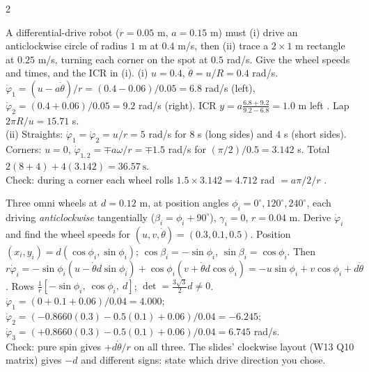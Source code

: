 \begin{multicols}{2}
\begin{examq}
A differential-drive robot ($r=0.05$ m, $a=0.15$ m) must (i) drive an anticlockwise circle of radius $1$ m at $0.4$ m/s, then (ii) trace a $2\times1$ m rectangle at $0.25$ m/s, turning each corner on the spot at $0.5$ rad/s. Give the wheel speeds and times, and the ICR in (i).
\solution
(i) $u=0.4$, $\dot\theta=u/R=0.4$ rad/s. $\dot\varphi_1=(u-a\dot\theta)/r=(0.4-0.06)/0.05=\boxed{6.8}$ rad/s (left), $\dot\varphi_2=(0.4+0.06)/0.05=\boxed{9.2}$ rad/s (right). ICR $y=a\frac{6.8+9.2}{9.2-6.8}=1.0$ m left \checkmark. Lap $2\pi R/u=15.71$ s. \\
(ii) Straights: $\dot\varphi_1=\dot\varphi_2=u/r=\boxed{5}$ rad/s for $8$ s (long sides) and $4$ s (short sides). Corners: $u=0$, $\dot\varphi_{1,2}=\mp a\omega/r=\boxed{\mp1.5}$ rad/s for $(\pi/2)/0.5=3.142$ s. Total $2(8+4)+4(3.142)=\boxed{36.57\ \text{s}}$. \\
Check: during a corner each wheel rolls $1.5\times3.142=4.712$ rad $=a\pi/2/r$ \checkmark. \chk
\end{examq}

\begin{examq}
Three omni wheels at $d=0.12$ m, at position angles $\phi_i=0^\circ,120^\circ,240^\circ$, each driving \emph{anticlockwise} tangentially ($\beta_i=\phi_i+90^\circ$), $\gamma_i=0$, $r=0.04$ m. Derive $\dot\varphi_i$ and find the wheel speeds for $(u,v,\dot\theta)=(0.3,0.1,0.5)$.
\solution
Position $(x_i,y_i)=d(\cos\phi_i,\sin\phi_i)$; $\cos\beta_i=-\sin\phi_i$, $\sin\beta_i=\cos\phi_i$. Then $r\dot\varphi_i=-\sin\phi_i(u-\dot\theta d\sin\phi_i)+\cos\phi_i(v+\dot\theta d\cos\phi_i)=-u\sin\phi_i+v\cos\phi_i+d\dot\theta$. Rows $\frac1r[-\sin\phi_i,\ \cos\phi_i,\ d]$; $\det=\frac{3\sqrt3}2d\neq0$. \\
$\dot\varphi_1=(0+0.1+0.06)/0.04=\boxed{4.000}$; $\dot\varphi_2=(-0.8660(0.3)-0.5(0.1)+0.06)/0.04=\boxed{-6.245}$; $\dot\varphi_3=(+0.8660(0.3)-0.5(0.1)+0.06)/0.04=\boxed{6.745}$ rad/s. \\
Check: pure spin gives $+d\dot\theta/r$ on all three. The slides' clockwise layout (W13 Q10 matrix) gives $-d$ and different signs: state which drive direction you chose. \chk
\end{examq}


\end{multicols}
